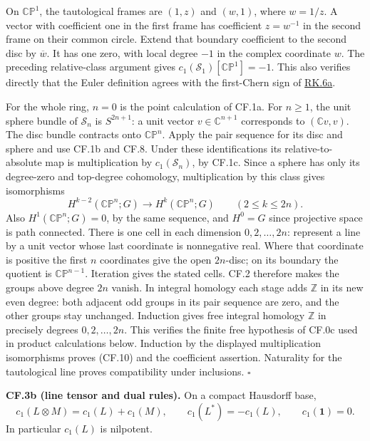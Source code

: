 \documentclass[
  11pt,
]{article}
\begin{document}
On \(\mathbb{CP}^1\), the tautological frames are \((1,z)\) and
\((w,1)\), where \(w=1/z\). A vector with coefficient one in the first
frame has coefficient \(z=w^{-1}\) in the second frame on their common
circle. Extend that boundary coefficient to the second disc by
\(\overline w\). It has one zero, with local degree \(-1\) in the
complex coordinate \(w\). The preceding relative-class argument gives
\(c_1(\mathcal S_1)[\mathbb{CP}^1]=-1\). This also verifies directly
that the Euler definition agrees with the first-Chern sign of
\href{../relative-k-foundations/relative-k-foundations.html\#rk-line-sign}{RK.6a}.

For the whole ring, \(n=0\) is the point calculation of CF.1a. For
\(n\geq1\), the unit sphere bundle of \(\mathcal S_n\) is \(S^{2n+1}\):
a unit vector \(v\in\mathbb C^{n+1}\) corresponds to \((\mathbb Cv,v)\).
The disc bundle contracts onto \(\mathbb{CP}^n\). Apply the pair
sequence for its disc and sphere and use CF.1b and CF.8. Under these
identifications its relative-to-absolute map is multiplication by
\(c_1(\mathcal S_n)\), by CF.1c. Since a sphere has only its degree-zero
and top-degree cohomology, multiplication by this class gives
isomorphisms \[
H^{k-2}(\mathbb{CP}^n;G)\longrightarrow H^k(\mathbb{CP}^n;G)
\qquad(2\leq k\leq2n).
\] Also \(H^1(\mathbb{CP}^n;G)=0\), by the same sequence, and \(H^0=G\)
since projective space is path connected. There is one cell in each
dimension \(0,2,\ldots,2n\): represent a line by a unit vector whose
last coordinate is nonnegative real. Where that coordinate is positive
the first \(n\) coordinates give the open \(2n\)-disc; on its boundary
the quotient is \(\mathbb{CP}^{n-1}\). Iteration gives the stated cells.
CF.2 therefore makes the groups above degree \(2n\) vanish. In integral
homology each stage adds \(\mathbb Z\) in its new even degree: both
adjacent odd groups in its pair sequence are zero, and the other groups
stay unchanged. Induction gives free integral homology \(\mathbb Z\) in
precisely degrees \(0,2,\ldots,2n\). This verifies the finite free
hypothesis of CF.0c used in product calculations below. Induction by the
displayed multiplication isomorphisms proves (CF.10) and the coefficient
assertion. Naturality for the tautological line proves compatibility
under inclusions. \(\square\)

\textbf{CF.3b (line tensor and dual rules).} On a compact Hausdorff
base, \[
c_1(L\otimes M)=c_1(L)+c_1(M),\qquad
c_1(L^*)=-c_1(L),\qquad c_1(\mathbf1)=0.
\tag{CF.11}
\] In particular \(c_1(L)\) is nilpotent.
\end{document}
